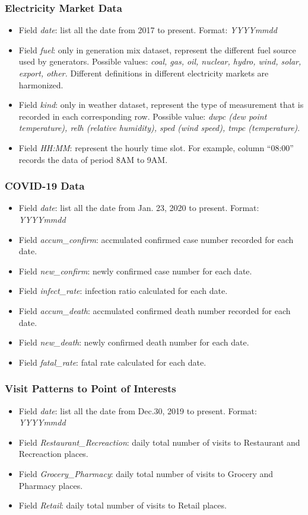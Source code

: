 \documentclass[10pt]{article}
\numberwithin{equation}{section}
\numberwithin{table}{section}
\numberwithin{figure}{section}
\begin{document}
\subsubsection{Electricity Market Data}
\begin{itemize}
	\item Field \textit{date}: list all the date from 2017 to present. Format: \textit{YYYYmmdd}
	\item Field \textit{fuel}: only in generation mix dataset, represent the different fuel source used by generators. Possible values: \textit{coal, gas, oil, nuclear, hydro, wind, solar, export, other.} Different definitions in different electricity markets are harmonized.
	\item Field \textit{kind}: only in weather dataset, represent the type of measurement that is recorded in each corresponding row. Possible value: \textit{dwpc (dew point temperature), relh (relative humidity), sped (wind speed), tmpc (temperature)}.
	\item Field \textit{HH:MM}: represent the hourly time slot. For example, column ``08:00'' records the data of period 8AM to 9AM.
\end{itemize}
\subsubsection{COVID-19 Data}
\begin{itemize}
	\item Field \textit{date}: list all the date from Jan. 23, 2020 to present. Format: \textit{YYYYmmdd}
	\item Field \textit{accum\_confirm}: accmulated confirmed case number recorded for each date.
	\item Field \textit{new\_confirm}: newly confirmed case number for each date.
	\item Field \textit{infect\_rate}: infection ratio calculated for each date.
	\item Field \textit{accum\_death}: accmulated confirmed death number recorded for each date.
	\item Field \textit{new\_death}: newly confirmed death number for each date.
	\item Field \textit{fatal\_rate}: fatal rate calculated for each date.
\end{itemize}
\subsubsection{Visit Patterns to Point of Interests}
\begin{itemize}
	\item Field \textit{date}: list all the date from Dec.30, 2019 to present. Format: \textit{YYYYmmdd}
	\item Field \textit{Restaurant\_Recreaction}: daily total number of visits to Restaurant and Recreaction places. 
	\item Field \textit{Grocery\_Pharmacy}: daily total number of visits to Grocery and Pharmacy places.
	\item Field \textit{Retail}: daily total number of visits to Retail places. 
\end{itemize}
\end{document}
